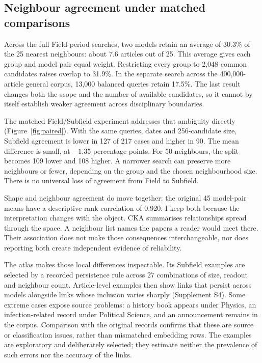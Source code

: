 \documentclass[12pt]{article}
\begin{document}
\subsection{Neighbour agreement under matched comparisons}
Across the full Field-period searches, two models retain an average of 30.3\% of the 25 nearest neighbours: about 7.6 articles out of 25. This average gives each group and model pair equal weight. Restricting every group to 2,048 common candidates raises overlap to 31.9\%. In the separate search across the 400,000-article general corpus, 13,000 balanced queries retain 17.5\%. The last result changes both the scope and the number of available candidates, so it cannot by itself establish weaker agreement across disciplinary boundaries.

The matched Field/Subfield experiment addresses that ambiguity directly (Figure~\ref{fig:paired}). With the same queries, dates and 256-candidate size, Subfield agreement is lower in 127 of 217 cases and higher in 90. The mean difference is small, at $-1.35$ percentage points. For 50 neighbours, the split becomes 109 lower and 108 higher. A narrower search can preserve more neighbours or fewer, depending on the group and the chosen neighbourhood size. There is no universal loss of agreement from Field to Subfield.

Shape and neighbour agreement do move together: the original 45 model-pair means have a descriptive rank correlation of 0.920. I keep both because the interpretation changes with the object. CKA summarises relationships spread through the space. A neighbour list names the papers a reader would meet there. Their association does not make those consequences interchangeable, nor does reporting both create independent evidence of reliability.

The atlas makes those local differences inspectable. Its Subfield examples are selected by a recorded persistence rule across 27 combinations of size, readout and neighbour count. Article-level examples then show links that persist across models alongside links whose inclusion varies sharply (Supplement S4). Some extreme cases expose source problems: a history book appears under Physics, an infection-related record under Political Science, and an announcement remains in the corpus. Comparison with the original records confirms that these are source or classification issues, rather than mismatched embedding rows. The examples are exploratory and deliberately selected; they estimate neither the prevalence of such errors nor the accuracy of the links.
\end{document}
